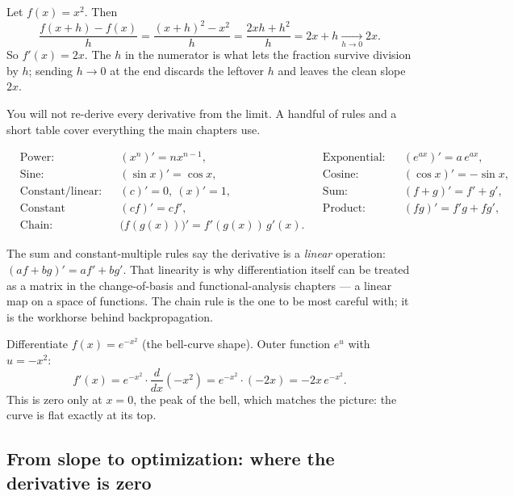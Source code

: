\begin{example}
\label{ch39:ex-deriv}
Let $f(x) = x^2$. Then
\[
\frac{f(x+h)-f(x)}{h} = \frac{(x+h)^2 - x^2}{h} = \frac{2xh + h^2}{h} = 2x + h \xrightarrow[h\to 0]{} 2x.
\]
So $f'(x) = 2x$. The $h$ in the numerator is what lets the fraction survive division by $h$; sending
$h\to 0$ at the end discards the leftover $h$ and leaves the clean slope $2x$.
\end{example}

You will not re-derive every derivative from the limit. A handful of rules and a short table cover
everything the main chapters use.

\begin{formalbox}
\setlength{\arraycolsep}{3pt}
\begin{align*}
&\text{Power:} && (x^n)' = n x^{n-1}, & &\text{Exponential:} && (e^{ax})' = a\,e^{ax},\\
&\text{Sine:} && (\sin x)' = \cos x, & &\text{Cosine:} && (\cos x)' = -\sin x,\\
&\text{Constant/linear:} && (c)' = 0,\ (x)' = 1, & &\text{Sum:} && (f+g)' = f' + g',\\
&\text{Constant multiple:} && (cf)' = c f', & &\text{Product:} && (fg)' = f'g + fg',\\
&\text{Chain:} && \bigl(f(g(x))\bigr)' = f'(g(x))\,g'(x). & & &&
\end{align*}
\end{formalbox}

The sum and constant-multiple rules say the derivative is a \emph{linear} operation: $(af + bg)' = af'
+ bg'$. That linearity is why differentiation itself can be treated as a matrix in the
change-of-basis and functional-analysis chapters --- a linear map on a space of functions. The chain
rule is the one to be most careful with; it is the workhorse behind backpropagation.

\begin{example}
\label{ch39:ex-chain}
Differentiate $f(x) = e^{-x^2}$ (the bell-curve shape). Outer function $e^{u}$ with $u = -x^2$:
\[
f'(x) = e^{-x^2}\cdot\frac{d}{dx}(-x^2) = e^{-x^2}\cdot(-2x) = -2x\,e^{-x^2}.
\]
This is zero only at $x = 0$, the peak of the bell, which matches the picture: the curve is flat
exactly at its top.
\end{example}

\subsection{From slope to optimization: where the derivative is zero}
\label{ch39:optimization-1d}

